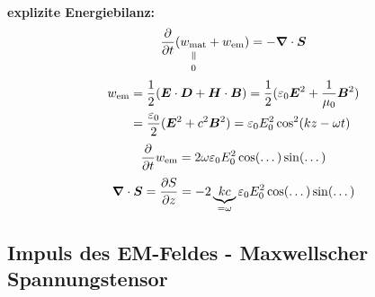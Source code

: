 \\
\textbf{explizite Energiebilanz:}
\begin{equation*}
\prt{}{t} (\equalto{w_{\tx{mat}}}{0} + w_{\tx{em}}) = - \vabla \cdot \vec{S}
\end{equation*}
\begin{align*}
w_{\textrm{em}} &= \frac{1}{2} (\bm{E} \cdot \bm{D} + \bm{H} \cdot \bm{B}) = \frac{1}{2} (\varepsilon_0 \bm{E}^2 + \frac{1}{\mu_0} \bm{B}^2) \\
&= \frac{\varepsilon_0}{2} (\bm{E}^2 + c^2 \bm{B}^2) = \varepsilon_0 E_0^2 \cos^2(kz - \omega t)
\end{align*}
\begin{equation*}
\frac{\partial }{\partial t} w_{\textrm{em}} = 2 \omega \varepsilon_0 E_0^2 \cos(\dots) \sin(\dots)
\end{equation*}
\begin{equation*}
\bm{\nabla} \cdot \bm{S} = \frac{\partial S}{\partial z} = - 2 \underbrace{kc}_{= \omega} \varepsilon_0 E_0^2 \cos(\dots) \sin(\dots)
\end{equation*}

\subsection{Impuls des EM-Feldes - Maxwellscher Spannungstensor}

